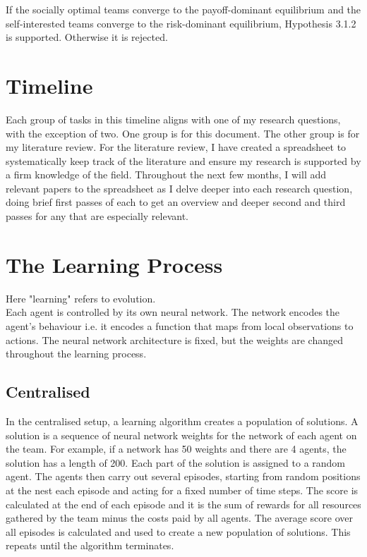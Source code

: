 \documentclass[12pt]{article}
\begin{document}
If the socially optimal teams converge to the payoff-dominant equilibrium and the self-interested teams converge to the risk-dominant equilibrium, Hypothesis 3.1.2 is supported.
Otherwise it is rejected.\\

\section{Timeline} \label{timeline}

Each group of tasks in this timeline aligns with one of my research questions, with the exception of two.
One group is for this document.
The other group is for my literature review.
For the literature review, I have created a spreadsheet to systematically keep track of the literature and ensure my research is supported by a firm knowledge of the field. 
Throughout the next few months, I will add relevant papers to the spreadsheet as I delve deeper into each research question, doing brief first passes of each to get an overview and deeper second and third passes for any that are especially relevant.\\






\appendix

\section{The Learning Process}\label{learning}

Here "learning" refers to evolution.\\

Each agent is controlled by its own neural network. 
The network encodes the agent’s behaviour i.e. it encodes a function that maps from local observations to actions. 
The neural network architecture is fixed, but the weights are changed throughout the learning process.\\

\subsection{Centralised}

In the centralised setup, a learning algorithm creates a population of solutions. 
A solution is a sequence of neural network weights for the network of each agent on the team. 
For example, if a network has 50 weights and there are 4 agents, the solution has a length of 200. 
Each part of the solution is assigned to a random agent. 
The agents then carry out several episodes, starting from random positions at the nest each episode and acting for a fixed number of time steps. 
The score is calculated at the end of each episode and it is the sum of rewards for all resources gathered by the team minus the costs paid by all agents. 
The average score over all episodes is calculated and used to create a new population of solutions. 
This repeats until the algorithm terminates.\\
\end{document}
